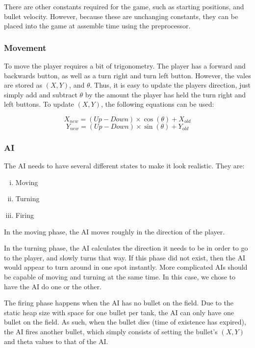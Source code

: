 \documentclass[onecolumn]{IEEEtran}
\begin{document}
There are other constants required for the game, such as starting positions, and bullet velocity.  However, because these are unchanging constants, they can be placed into the game at assemble time using the preprocessor.

\subsubsection{Movement}
To move the player requires a bit of trigonometry.  The player has a forward and backwards button, as well as a turn right and turn left button.  However, the vales are stored as $(X,Y)$, and $\theta$.  Thus, it is easy to update the players direction, just simply add and subtract $\theta$ by the amount the player has held the turn right and left buttons.  To update $(X,Y)$, the following equations can be used:

\begin{equation}
	X_{new} = (Up-Down)\times \cos(\theta) + X_{old}
\end{equation}
\begin{equation}
	Y_{new} = (Up-Down)\times \sin(\theta) + Y_{old}
\end{equation}

\subsubsection{AI}
The AI needs to have several different states to make it look realistic.  They are:

\begin{enumerate}[i)]
	\item Moving
	\item Turning
	\item Firing
\end{enumerate}

In the moving phase, the AI moves roughly in the direction of the player.

In the turning phase, the AI calculates the direction it needs to be in order to go to the player, and slowly turns that way.  If this phase did not exist, then the AI would appear to turn around in one spot instantly.  More complicated AIs should be capable of moving and turning at the same time.  In this case, we chose to have the AI do one or the other.

The firing phase happens when the AI has no bullet on the field.  Due to the static heap size with space for one bullet per tank, the AI can only have one bullet on the field.  As such, when the bullet dies (time of existence has expired), the AI fires another bullet, which simply consists of setting the bullet's $(X,Y)$ and theta values to that of the AI.
\end{document}
